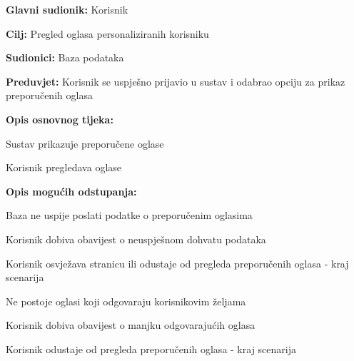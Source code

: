 					\noindent {}
					\begin{packed_item}
	
						\item \textbf{Glavni sudionik: }Korisnik
						\item  \textbf{Cilj:} Pregled oglasa personaliziranih korisniku
						\item  \textbf{Sudionici:} Baza podataka
						\item  \textbf{Preduvjet:} Korisnik se uspješno prijavio u sustav i odabrao opciju za prikaz preporučenih oglasa
						\item  \textbf{Opis osnovnog tijeka:}
						
						\item[] \begin{packed_enum}
							\item Sustav prikazuje preporučene oglase
							\item Korisnik pregledava oglase
						\end{packed_enum}

						\item  \textbf{Opis mogućih odstupanja:}

						\item[] \begin{packed_item}
							\item[1.a] Baza ne uspije poslati podatke o preporučenim oglasima
							\item[] \begin{packed_enum}
								
								\item Korisnik dobiva obavijest o neuspješnom dohvatu podataka
								\item Korisnik osvježava stranicu ili odustaje od pregleda preporučenih oglasa - kraj scenarija
							
							\end{packed_enum}	
							\item[1.b] Ne postoje oglasi koji odgovaraju korisnikovim željama
							\item[] \begin{packed_enum}
								
								\item Korisnik dobiva obavijest o manjku odgovarajućih oglasa
								\item Korisnik odustaje od pregleda preporučenih oglasa - kraj scenarija
							
							\end{packed_enum}	
						\end{packed_item}	
					\end{packed_item}

